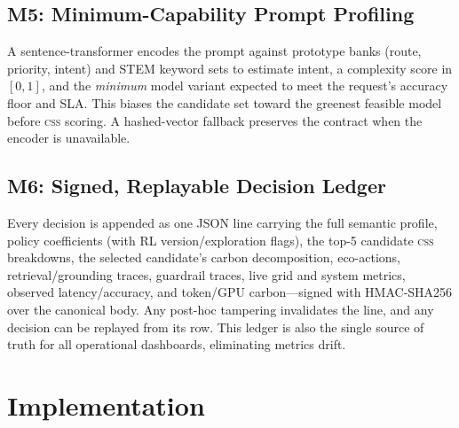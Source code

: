 \documentclass[10pt,twocolumn]{article}
\newcommand{\css}{\textsc{css}}
\begin{document}
\subsection{M5: Minimum-Capability Prompt Profiling}
\label{sec:m5}

A sentence-transformer encodes the prompt against prototype banks (route,
priority, intent) and STEM keyword sets to estimate intent, a complexity score
in $[0,1]$, and the \emph{minimum} model variant expected to meet the request's
accuracy floor and SLA. This biases the candidate set toward the greenest
feasible model before \css{} scoring. A hashed-vector fallback preserves the
contract when the encoder is unavailable.

\subsection{M6: Signed, Replayable Decision Ledger}
\label{sec:m6}

Every decision is appended as one JSON line carrying the full semantic profile,
policy coefficients (with RL version/exploration flags), the top-5 candidate
\css{} breakdowns, the selected candidate's carbon decomposition, eco-actions,
retrieval/grounding traces, guardrail traces, live grid and system metrics,
observed latency/accuracy, and token/GPU carbon---signed with HMAC-SHA256 over
the canonical body. Any post-hoc tampering invalidates the line, and any
decision can be replayed from its row. This ledger is also the single source of
truth for all operational dashboards, eliminating metrics drift.

\section{Implementation}
\label{sec:impl}
\end{document}
